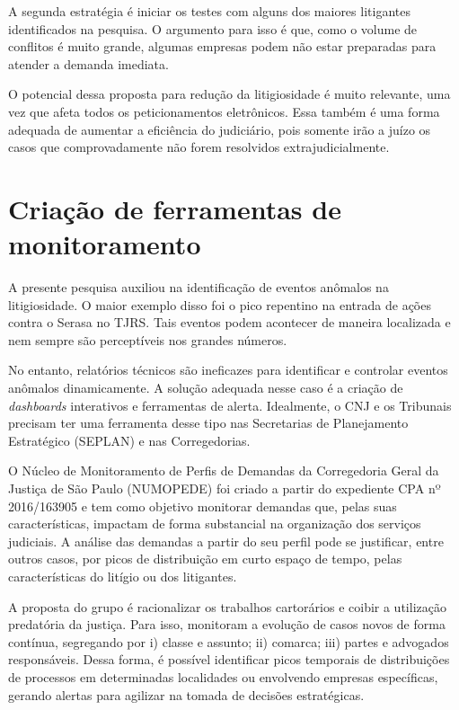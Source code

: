 \documentclass[]{report}
\begin{document}
A segunda estratégia é iniciar os testes com alguns dos maiores
litigantes identificados na pesquisa. O argumento para isso é que, como
o volume de conflitos é muito grande, algumas empresas podem não estar
preparadas para atender a demanda imediata.

O potencial dessa proposta para redução da litigiosidade é muito
relevante, uma vez que afeta todos os peticionamentos eletrônicos. Essa
também é uma forma adequada de aumentar a eficiência do judiciário, pois
somente irão a juízo os casos que comprovadamente não forem resolvidos
extrajudicialmente.

\section{Criação de ferramentas de
monitoramento}\label{criacao-de-ferramentas-de-monitoramento}

A presente pesquisa auxiliou na identificação de eventos anômalos na
litigiosidade. O maior exemplo disso foi o pico repentino na entrada de
ações contra o Serasa no TJRS. Tais eventos podem acontecer de maneira
localizada e nem sempre são perceptíveis nos grandes números.

No entanto, relatórios técnicos são ineficazes para identificar e
controlar eventos anômalos dinamicamente. A solução adequada nesse caso
é a criação de \emph{dashboards} interativos e ferramentas de alerta.
Idealmente, o CNJ e os Tribunais precisam ter uma ferramenta desse tipo
nas Secretarias de Planejamento Estratégico (SEPLAN) e nas
Corregedorias.

O Núcleo de Monitoramento de Perfis de Demandas da Corregedoria Geral da
Justiça de São Paulo (NUMOPEDE) foi criado a partir do expediente CPA nº
2016/163905 e tem como objetivo monitorar demandas que, pelas suas
características, impactam de forma substancial na organização dos
serviços judiciais. A análise das demandas a partir do seu perfil pode
se justificar, entre outros casos, por picos de distribuição em curto
espaço de tempo, pelas características do litígio ou dos litigantes.

A proposta do grupo é racionalizar os trabalhos cartorários e coibir a
utilização predatória da justiça. Para isso, monitoram a evolução de
casos novos de forma contínua, segregando por i) classe e assunto; ii)
comarca; iii) partes e advogados responsáveis. Dessa forma, é possível
identificar picos temporais de distribuições de processos em
determinadas localidades ou envolvendo empresas específicas, gerando
alertas para agilizar na tomada de decisões estratégicas.
\end{document}
